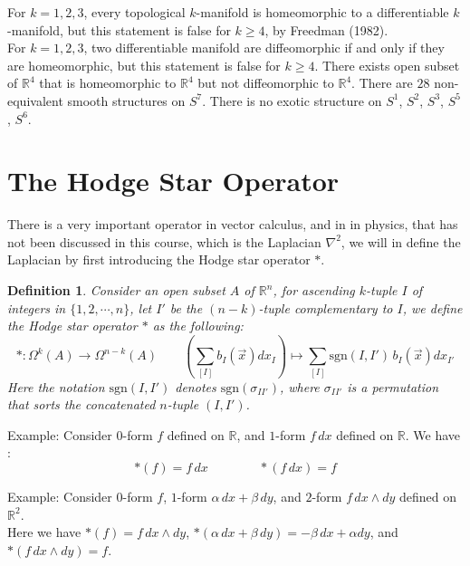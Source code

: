 \documentclass[15pt]{book}
\theoremstyle{break}
\theoremstyle{break}
\newtheorem{defn}{Definition}[corL]
\newcommand{\R}{\mathbb{R}}
\newcommand{\sgn}{\text{sgn}}
\newcommand{\that}[1]{\widetilde{#1}}
\newcommand{\example}{\color{green}Example: \color{black}}
\newcommand{\exercise}{\color{green}Exercise: \color{black}}
\begin{document}

For $k=1,2,3$, every topological $k$-manifold is homeomorphic to a differentiable $k$-manifold, but this statement is false for $k\geq 4$, by Freedman (1982).\\

For $k=1,2,3$, two differentiable manifold are diffeomorphic if and only if they are homeomorphic, but this statement is false for $k \geq 4$. There exists open subset of $\R^4$ that is homeomorphic to $\R^4$ but not diffeomorphic to $\R^4$. There are $28$ non-equivalent smooth structures on $S^7$. There is no exotic structure on $S^1$, $S^2$, $S^3$, $S^5$, $S^6$.


\newpage
\section[The Hodge Star Operator]{\color{red}The Hodge Star Operator\color{black}}
There is a very important operator in vector calculus, and in in physics, that has not been discussed in this course, which is the Laplacian $\nabla^2$, we will in define the Laplacian by first introducing the Hodge star operator $*$. 

\begin{defn}
Consider an open subset $A$ of $\R^n$, for ascending $k$-tuple $I$ of integers in $\{1,2,\cdots, n\}$, let $I'$ be the $(n-k)$-tuple complementary to $I$, we define the Hodge star operator $*$ as the following: 
$$ *: \Omega^k(A) \to \Omega^{n-k}(A) \qquad\left(\sum_{[I]}b_I(\vec{x}) dx_I\right) \mapsto \sum_{[I]}\text{sgn}(I,I')\, b_I(\vec{x}) dx_{I'}$$
Here the notation $\text{sgn}(I,I')$ denotes $\sgn(\sigma_{II'})$, where $\sigma_{II'}$ is a permutation that sorts the concatenated $n$-tuple $(I,I')$.
\end{defn}

\hfill\break
\example
Consider $0$-form $f$ defined on $\R$, and $1$-form $f\, dx$ defined on $\R$. We have :
$$*(f) = f\,dx \qquad\qquad *(f\, dx) = f$$

\example
Consider $0$-form $f$, $1$-form $\alpha\, dx+ \beta \, dy$, and $2$-form $f\, dx \wedge dy$ defined on $\R^2$. \\
Here we have $*(f) = f\, dx\wedge dy$, $*(\alpha\, dx + \beta \, dy) = -\beta \, dx + \alpha dy$, and $*(f\, dx \wedge dy) = f$. \\
\end{document}
